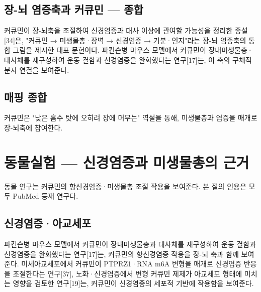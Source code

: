 \documentclass[12pt,oneside]{book}
\begin{document}
\subsection{장-뇌 염증축과 커큐민 — 종합}

커큐민이 장-뇌축을 조절하여 신경염증과 대사 이상에 관여할 가능성을 정리한 종설[34]은, "커큐민 → 미생물총·장벽 → 신경염증 → 기분·인지"라는 장-뇌 염증축의 통합 그림을 제시한 대표 문헌이다. 파킨슨병 마우스 모델에서 커큐민이 장내미생물총·대사체를 재구성하여 운동 결함과 신경염증을 완화했다는 연구[17]는, 이 축의 구체적 분자 연결을 보여준다.

\subsection{매핑 종합}

\vspace{2pt}\vspace{3pt}

커큐민은 "낮은 흡수 탓에 오히려 장에 머무는" 역설을 통해, 미생물총과 염증을 매개로 장-뇌축에 참여한다.

\section{동물실험 — 신경염증과 미생물총의 근거}

동물 연구는 커큐민의 항신경염증·미생물총 조절 작용을 보여준다. 본 절의 인용은 모두 PubMed 등재 연구다.

\subsection{신경염증·아교세포}

파킨슨병 마우스 모델에서 커큐민이 장내미생물총과 대사체를 재구성하여 운동 결함과 신경염증을 완화했다는 연구[17]는, 커큐민의 항신경염증 작용을 장-뇌 축과 함께 보여준다. 미세아교세포에서 커큐민이 PTPRZ1·RNA m6A 변형을 매개로 신경염증 반응을 조절한다는 연구[37], 노화·신경염증에서 변형 커큐민 제제가 아교세포 형태에 미치는 영향을 검토한 연구[19]는, 커큐민이 신경염증의 세포적 기반에 작용함을 보여준다.
\end{document}
